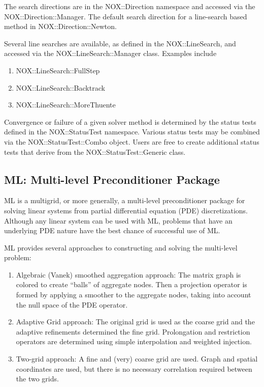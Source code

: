 \documentclass[12pt,relax]{SANDreport}
\begin{document}
The search directions are in the NOX::Direction namespace and accessed via the NOX::Direction::Manager. The
default search direction for a line-search based method in NOX::Direction::Newton. 

Several line searches are available, as defined in the NOX::LineSearch, and accessed via the
NOX::LineSearch::Manager class. Examples include 
\begin{enumerate}
\item NOX::LineSearch::FullStep
\item NOX::LineSearch::Backtrack
\item NOX::LineSearch::MoreThuente
\end{enumerate}

Convergence or failure of a given solver method is determined by the status tests defined in the
NOX::StatusTest namespace. Various status tests may be combined via the NOX::StatusTest::Combo object. Users
are free to create additional status tests that derive from the NOX::StatusTest::Generic class. 

\subsection{ML: Multi-level Preconditioner Package}

ML is a multigrid, or more generally, a multi-level preconditioner package for solving linear systems
from partial differential equation (PDE) discretizations. Although any linear system can be used with ML,
problems that have an underlying PDE nature have the best chance of successful use of ML.

ML provides several approaches to constructing and solving the multi-level problem:
\begin{enumerate}
\item Algebraic (Vanek) smoothed aggregation approach:  The matrix graph is colored to 
create ``balls'' of aggregate nodes. Then a projection operator is formed by applying a smoother to the 
aggregate nodes, taking into account the null space of the PDE operator.
\item Adaptive Grid approach: The original grid is used as the coarse grid and the adaptive refinements
determined the fine grid.  Prolongation and restriction operators are determined using simple interpolation
and weighted injection.
\item Two-grid approach: A fine and (very) coarse grid are used.  Graph and spatial coordinates are used, 
but there is no necessary correlation required between the two grids.
\end{enumerate}
\end{document}
